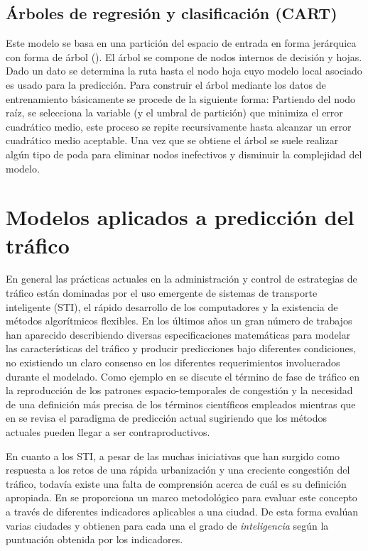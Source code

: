 \documentclass{llncs}
\begin{document}
\subsection{Árboles de regresión y clasificación (CART)}
Este modelo se basa en una partición del espacio de entrada en forma jerárquica con forma de árbol (\cite{breiman1984classification}). El árbol se compone de nodos internos de decisión y hojas. Dado un dato se determina la ruta hasta el nodo hoja cuyo modelo local asociado es usado para la predicción.  Para construir el árbol mediante los datos de entrenamiento básicamente se procede de la siguiente forma: 
Partiendo del nodo raíz, se selecciona la variable (y el umbral de partición) que minimiza el error cuadrático medio, este proceso se repite recursivamente hasta alcanzar un error cuadrático medio aceptable. Una vez que se obtiene el árbol se suele realizar algún tipo de poda para eliminar nodos inefectivos y disminuir la complejidad del modelo.



\section{Modelos aplicados a predicción del tráfico}

En general las prácticas actuales en la administración y control de estrategias de tráfico están dominadas por el uso emergente de sistemas de transporte inteligente (STI), el rápido desarrollo de los computadores y la existencia de métodos algorítmicos flexibles. En los últimos años un gran número de trabajos han aparecido describiendo diversas especificaciones matemáticas para modelar las características del tráfico y producir predicciones bajo diferentes condiciones, no existiendo un claro consenso en los diferentes requerimientos involucrados durante el modelado.  Como ejemplo en \cite{Treiber2010983} se discute el término de fase de tráfico en la reproducción de los patrones espacio-temporales de congestión y la necesidad de una definición más precisa de los términos científicos empleados mientras que en \cite{boyce2002sequential} se revisa el paradigma de predicción actual sugiriendo que los métodos actuales pueden llegar a ser contraproductivos.

En cuanto a los STI, a pesar de las muchas iniciativas que han surgido como respuesta a los retos de una rápida urbanización y una creciente congestión del tráfico, todavía existe una falta de comprensión acerca de cuál es su definición apropiada. En \cite{Debnath201447} se proporciona un marco metodológico para evaluar este concepto a través de diferentes indicadores aplicables a una ciudad. De esta forma evalúan varias ciudades y obtienen para cada una el grado de \emph{inteligencia} según la puntuación obtenida por los indicadores.
\end{document}
